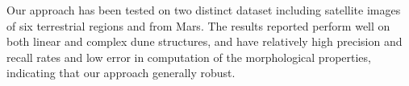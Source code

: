 \documentclass[11pt]{article}
\begin{document}
Our approach has been tested on two distinct dataset including satellite images of six terrestrial regions and from Mars. The results reported perform well on both linear and complex dune structures, and have relatively high precision and recall rates and low error in computation of the morphological properties, indicating that our approach generally robust.








{}

	
\end{document}
